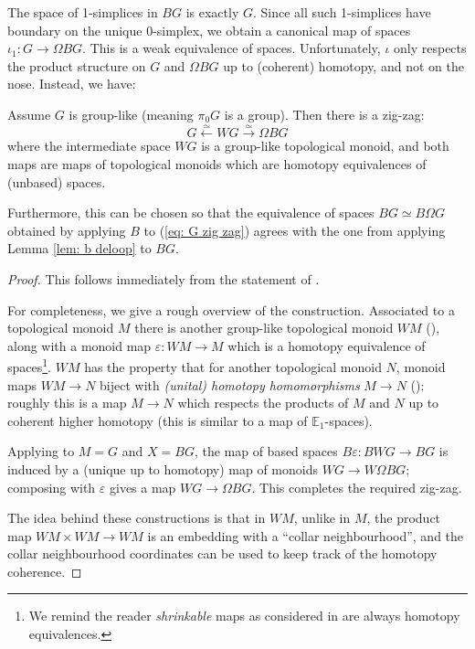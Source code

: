 \documentclass{TPmod}
\def\bE{\mathbb{E}}
\newcommand{\eps}{\varepsilon}
\numberwithin{equation}{section}
\begin{document}
    The space of 1-simplices in $BG$ is exactly $G$. Since all such 1-simplices have boundary on the unique 0-simplex, we obtain a canonical map of spaces $\iota_1: G \to \Omega BG$. This is a weak equivalence of spaces. Unfortunately, $\iota$ only respects the product structure on $G$ and $\Omega BG$ up to (coherent) homotopy, and not on the nose. Instead, we have:
    \begin{lem}\label{lem: zig zag}
        Assume $G$ is group-like (meaning $\pi_0 G$ is a group). Then there is a zig-zag:
        \begin{equation}\label{eq: G zig zag}
            G \xleftarrow{\simeq} WG \xrightarrow{\simeq} \Omega BG
        \end{equation}
        where the intermediate space $WG$ is a group-like topological monoid, and both maps are maps of topological monoids which are homotopy equivalences of (unbased) spaces.

        Furthermore, this can be chosen so that the equivalence of spaces $BG \simeq B\Omega G$ obtained by applying $B$ to (\ref{eq: G zig zag}) agrees with the one from applying Lemma \ref{lem: b deloop} to $BG$.
    \end{lem}
    \begin{proof}
        This follows immediately from the statement of \cite[Theorem 1.3]{Vogt}.

        For completeness, we give a rough overview of the construction. Associated to a topological monoid $M$ there is another group-like topological monoid $WM$ (\cite[Definition 2.2]{Vogt}), along with a monoid map $\eps: WM \to M$ which is a homotopy equivalence of spaces\footnote{We remind the reader \emph{shrinkable} maps as considered in \cite[Definition 2.2]{Vogt} are always homotopy equivalences.}. $WM$ has the property that for another topological monoid $N$, monoid maps $WM \to N$ biject with \emph{(unital) homotopy homomorphisms} $M \to N$ (\cite[Definition 2.1]{Vogt}): roughly this is a map $M \to N$ which respects the products of $M$ and $N$ up to coherent higher homotopy (this is similar to a map of $\bE_1$-spaces). 
        
        Applying \cite[Theorem 4.4]{Vogt} to $M=G$ and $X=BG$, the map of based spaces $B\eps: BWG \to BG$ is induced by a (unique up to homotopy) map of monoids $WG \to W\Omega BG$; composing with $\eps$ gives a map $WG \to \Omega BG$. This completes the required zig-zag.

        The idea behind these constructions is that in $WM$, unlike in $M$, the product map $WM \times WM \to WM$ is an embedding with a ``collar neighbourhood'', and the collar neighbourhood coordinates can be used to keep track of the homotopy coherence.
    \end{proof}
\end{document}
